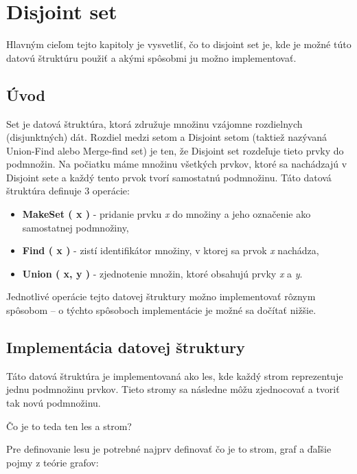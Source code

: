 \documentclass{book}
\begin{document}
\chapter{Disjoint set}

Hlavným cieľom tejto kapitoly je vysvetliť, čo to disjoint set je, kde je možné
túto datovú štruktúru použiť a akými spôsobmi ju možno implementovať.

\section{Úvod}

Set je datová štruktúra, ktorá združuje množinu vzájomne rozdielnych
(disjunktných) dát. Rozdiel medzi setom a Disjoint setom (taktiež nazývaná
Union-Find alebo Merge-find set) je ten, že Disjoint set rozdeľuje tieto prvky
do podmnožin. Na počiatku máme množinu všetkých prvkov, ktoré sa nachádzajú v
Disjoint sete a každý tento prvok tvorí samostatnú podmnožinu. Táto datová
štruktúra definuje 3 operácie:

\begin{itemize}
	\item \textbf{MakeSet ( x )} - pridanie prvku \textit{x} do množiny a
		jeho označenie ako samostatnej podmnožiny, 
	\item \textbf{Find ( x )} - zistí identifikátor množiny, v ktorej sa
		prvok \textit{x} nachádza, 
	\item \textbf{Union ( x, y )} - zjednotenie množin, ktoré obsahujú
		prvky \textit{x} a \textit{y}. 
\end{itemize}

Jednotlivé operácie tejto datovej štruktury možno implementovať rôznym spôsobom
-- o týchto spôsoboch implementácie je možné sa dočítať nižšie.

\section{Implementácia datovej štruktury}

Táto datová štruktúra je implementovaná ako les, kde každý strom reprezentuje
jednu podmnožinu prvkov. Tieto stromy sa následne môžu zjednocovať a tvoriť tak
novú podmnožinu. \newline \newline 

Čo je to teda ten les a strom? \newline \newline

Pre definovanie lesu je potrebné najprv definovať čo je to strom, graf a ďaľšie
pojmy z teórie grafov:
\end{document}
